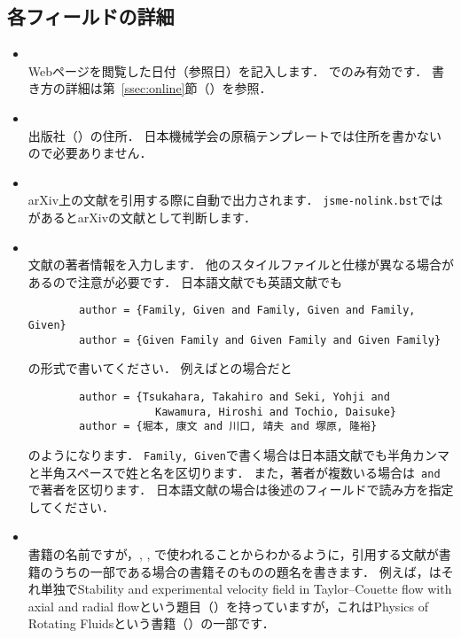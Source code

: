 \documentclass[a4paper,fleqn,uplatex,dvipdfmx]{jsarticle}
\newcommand{\jsmefile}{\texttt{jsme-nolink.bst}}
\begin{document}
\subsection{各フィールドの詳細}
\label{ssec:field}
\begin{itemize}
    \item \ttaccess \\
        Webページを閲覧した日付（参照日）を記入します．
        \ttonline でのみ有効です．
        書き方の詳細は第~\ref{ssec:online}節（\ttonline ）を参照．
    \item \ttaddress \\
        出版社（\ttpublisher）の住所．
        日本機械学会の原稿テンプレートでは住所を書かないので必要ありません．
    \item \ttarchivePrefix \\
        arXiv上の文献を引用する際に自動で出力されます．
        \jsmefile では\ttarchivePrefix があるとarXivの文献として判断します．
    \item \ttauthor \\
        文献の著者情報を入力します．
        他の\BibTeX{}スタイルファイルと仕様が異なる場合があるので注意が必要です．
        日本語文献でも英語文献でも
        \begin{verbatim}
        author = {Family, Given and Family, Given and Family, Given}
        author = {Given Family and Given Family and Given Family}
        \end{verbatim}
        の形式で書いてください．
        例えば\citet{Tsukahara:TSFP2005}と\citet{堀本:可視化情報2020}の場合だと
        \begin{verbatim}
        author = {Tsukahara, Takahiro and Seki, Yohji and 
                    Kawamura, Hiroshi and Tochio, Daisuke}
        author = {堀本, 康文 and 川口, 靖夫 and 塚原, 隆裕}
        \end{verbatim}
        のようになります．
        \verb|Family, Given|で書く場合は日本語文献でも半角カンマと半角スペースで姓と名を区切ります．
        また，著者が複数いる場合は\verb| and |で著者を区切ります．
        日本語文献の場合は後述の\ttyomi フィールドで読み方を指定してください．
    \item \ttbooktitle \\
        書籍の名前ですが，\ttconference, \ttincollection, \ttinproceedings で使われることからわかるように，引用する文献が書籍のうちの一部である場合の書籍そのものの題名を書きます．
        例えば，\citet{Lueptow:Springer2000}はそれ単独でStability and experimental velocity field in Taylor--Couette flow with axial and radial flowという題目（\tttitle）を持っていますが，これはPhysics of Rotating Fluidsという書籍（\ttbooktitle）の一部です．

\end{itemize}
\end{document}
